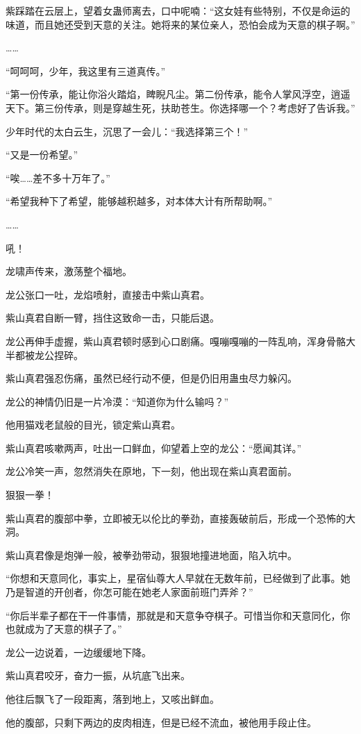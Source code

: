 \begin{this_body}
紫踩踏在云层上，望着女蛊师离去，口中呢喃：“这女娃有些特别，不仅是命运的味道，而且她还受到天意的关注。她将来的某位亲人，恐怕会成为天意的棋子啊。”

……

“呵呵呵，少年，我这里有三道真传。”

“第一份传承，能让你浴火踏焰，睥睨凡尘。第二份传承，能令人掌风浮空，逍遥天下。第三份传承，则是穿越生死，扶助苍生。你选择哪一个？考虑好了告诉我。”

少年时代的太白云生，沉思了一会儿：“我选择第三个！”

“又是一份希望。”

“唉……差不多十万年了。”

“希望我种下了希望，能够越积越多，对本体大计有所帮助啊。”

……

吼！

龙啸声传来，激荡整个福地。

龙公张口一吐，龙焰喷射，直接击中紫山真君。

紫山真君自断一臂，挡住这致命一击，只能后退。

龙公再伸手虚握，紫山真君顿时感到心口剧痛。嘎嘣嘎嘣的一阵乱响，浑身骨骼大半都被龙公捏碎。

紫山真君强忍伤痛，虽然已经行动不便，但是仍旧用蛊虫尽力躲闪。

龙公的神情仍旧是一片冷漠：“知道你为什么输吗？”

他用猫戏老鼠般的目光，锁定紫山真君。

紫山真君咳嗽两声，吐出一口鲜血，仰望着上空的龙公：“愿闻其详。”

龙公冷笑一声，忽然消失在原地，下一刻，他出现在紫山真君面前。

狠狠一拳！

紫山真君的腹部中拳，立即被无以伦比的拳劲，直接轰破前后，形成一个恐怖的大洞。

紫山真君像是炮弹一般，被拳劲带动，狠狠地撞进地面，陷入坑中。

“你想和天意同化，事实上，星宿仙尊大人早就在无数年前，已经做到了此事。她乃是智道的开创者，你怎可能在她老人家面前班门弄斧？”

“你后半辈子都在干一件事情，那就是和天意争夺棋子。可惜当你和天意同化，你也就成为了天意的棋子了。”

龙公一边说着，一边缓缓地下降。

紫山真君咬牙，奋力一振，从坑底飞出来。

他往后飘飞了一段距离，落到地上，又咳出鲜血。

他的腹部，只剩下两边的皮肉相连，但是已经不流血，被他用手段止住。


\end{this_body}
